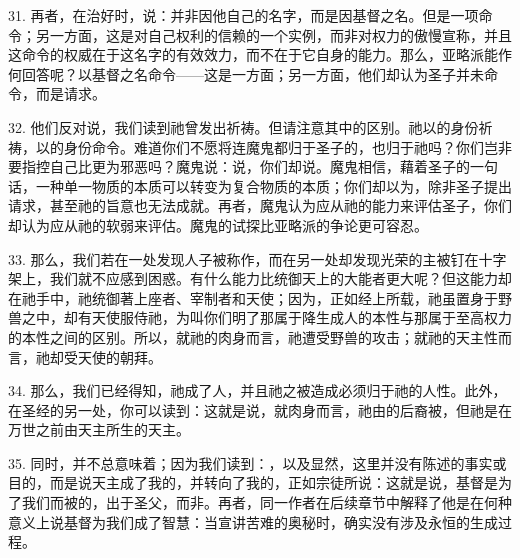 31. 再者，在治好时，说：并非因他自己的名字，而是因基督之名。但是一项命令；另一方面，这是对自己权利的信赖的一个实例，而非对权力的傲慢宣称，并且这命令的权威在于这名字的有效效力，而不在于它自身的能力。那么，亚略派能作何回答呢？以基督之名命令——这是一方面；另一方面，他们却认为圣子并未命令，而是请求。\par

32. 他们反对说，我们读到祂曾发出祈祷。但请注意其中的区别。祂以的身份祈祷，以的身份命令。难道你们不愿将连魔鬼都归于圣子的，也归于祂吗？你们岂非要指控自己比更为邪恶吗？魔鬼说：说，你们却说。魔鬼相信，藉着圣子的一句话，一种单一物质的本质可以转变为复合物质的本质；你们却以为，除非圣子提出请求，甚至祂的旨意也无法成就。再者，魔鬼认为应从祂的能力来评估圣子，你们却认为应从祂的软弱来评估。魔鬼的试探比亚略派的争论更可容忍。\par

33. 那么，我们若在一处发现人子被称作，而在另一处却发现光荣的主被钉在十字架上，我们就不应感到困惑。有什么能力比统御天上的大能者更大呢？但这能力却在祂手中，祂统御著上座者、宰制者和天使；因为，正如经上所载，祂虽置身于野兽之中，却有天使服侍祂，为叫你们明了那属于降生成人的本性与那属于至高权力的本性之间的区别。所以，就祂的肉身而言，祂遭受野兽的攻击；就祂的天主性而言，祂却受天使的朝拜。\par

34. 那么，我们已经得知，祂成了人，并且祂之被造成必须归于祂的人性。此外，在圣经的另一处，你可以读到：这就是说，就肉身而言，祂由的后裔被，但祂是在万世之前由天主所生的天主。\par

\par

35. 同时，并不总意味着；因为我们读到：，以及显然，这里并没有陈述的事实或目的，而是说天主成了我的，并转向了我的，正如宗徒所说：这就是说，基督是为了我们而被的，出于圣父，而非。再者，同一作者在后续章节中解释了他是在何种意义上说基督为我们成了智慧：当宣讲苦难的奥秘时，确实没有涉及永恒的生成过程。\par

